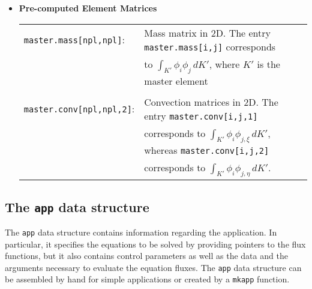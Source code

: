 \documentclass[11pt]{article}
\begin{document}
\begin{itemize}
\newpage

\item {\bf Pre-computed Element Matrices}

\begin{tabular}{|ll}
        \texttt{master.mass[npl,npl]}: &  Mass matrix in 2D. The entry \texttt{master.mass[i,j]} corresponds \\ & to
        $ \int_{K'} \phi_i \phi_j \, d K' $, where $K'$ is the master element
            \\  \\ 
        \texttt{master.conv[npl,npl,2]}: &  Convection matrices in 2D. The entry \texttt{master.conv[i,j,1]} \\ & corresponds  to
        $ \int_{K'} \phi_i \phi_{j,\xi} \, d K' $, whereas  \texttt{master.conv[i,j,2]} \\ & corresponds to $ \int_{K'} \phi_i \phi_{j,\eta} \, d K' $.
\end{tabular}

\end{itemize}
\newpage

\subsection{The \texttt{app} data structure}

The \texttt{app} data structure contains information regarding the application. In particular, it specifies the  equations to be solved
by providing pointers to the flux functions, but it also contains control parameters as well as the  data and the arguments necessary to evaluate the equation
fluxes. The \texttt{app} data structure can be assembled by hand for simple applications or created by a \texttt{mkapp} function.
\end{document}
